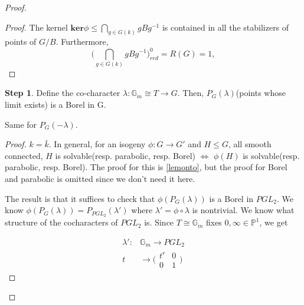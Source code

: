 \documentclass[12pt,a4paper,english]{article}
\theoremstyle{plain}
\theoremstyle{definition}
\newtheorem{step}{Step}
\begin{document}
\begin{proof}
\begin{proof}
The kernel $\textbf{ker}\phi\leq \bigcap\limits_{g\in G(k)}gBg^{-1}$ is contained in all the stabilizers of points of $G/B$. 
Furthermore,
\begin{equation*}
    \bigg(\bigcap\limits_{g\in G(k)}gBg^{-1}\bigg)^{0}_{red}=R(G)=1,
\end{equation*}
\end{proof}
\begin{step}
Define the co-character $\lambda:\mathbb{G}_{m}\cong T\rightarrow G$. Then, $P_{G}(\lambda)$(points whose limit exists) is a Borel in G. 

Same for $P_{G}(-\lambda)$.
\end{step}
\begin{proof}
$k=\bar{k}$. In general, for an isogeny $\phi: G\rightarrow G'$ and $H\leq G$, all smooth connected, $H$ is solvable(resp. parabolic, resp. Borel) $\Leftrightarrow$ $\phi(H)$ is solvable(resp. parabolic, resp. Borel). The proof for this is \ref{lemonto}, but the proof for Borel and parabolic is omitted since we don't need it here.




    The result is that it suffices to check that $\phi(P_{G}(\lambda))$ is a Borel in $PGL_{2}$. We know $\phi(P_{G}(\lambda))=P_{PGL_{2}}(\lambda')$ where $\lambda'=\phi\circ\lambda$ is nontrivial. We know what structure of the cocharacters of $PGL_{2}$ is. Since $T\cong\mathbb{G}_{m}$ fixes $0,\infty\in\mathbb{P}^{1}$, we get 


    \begin{align*}
    \lambda':&\mathbb{G}_{m}\rightarrow PGL_{2}\\
    t&\rightarrow \bigg(\begin{array}{cc}
        t^{r} &  0\\
         0& 1
    \end{array}\bigg)
    \end{align*}



\end{proof}
\end{proof}
\end{document}
